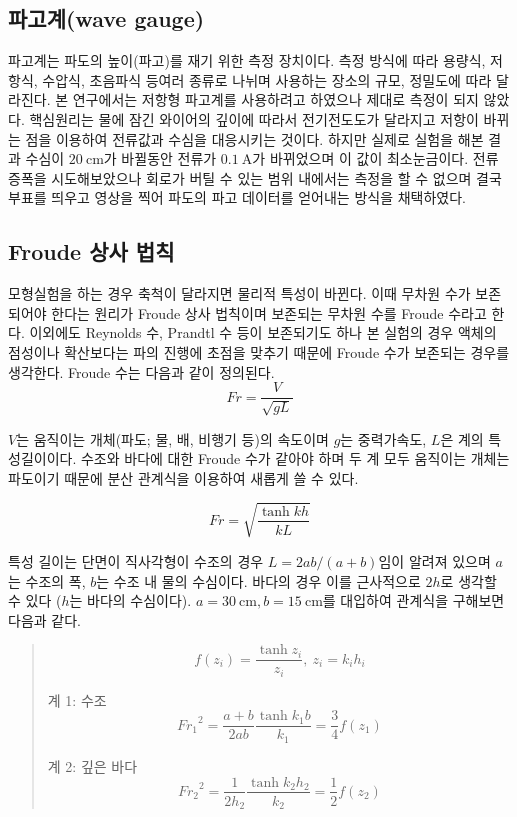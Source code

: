 \subsection{파고계(wave gauge)}

파고계는 파도의 높이(파고)를 재기 위한 측정 장치이다. 측정 방식에 따라 용량식, 저항식, 수압식, 초음파식 등여러 종류로 나뉘며 사용하는 장소의 규모, 정밀도에 따라 달라진다. 본 연구에서는 저항형 파고계를 사용하려고 하였으나 제대로 측정이 되지 않았다. 핵심원리는 물에 잠긴 와이어의 깊이에 따라서 전기전도도가 달라지고 저항이 바뀌는 점을 이용하여 전류값과 수심을 대응시키는 것이다. 하지만 실제로 실험을 해본 결과 수심이 $20\mathrm{~cm}$가 바뀔동안 전류가 $0.1\mathrm{~A}$가 바뀌었으며 이 값이 최소눈금이다. 전류 증폭을 시도해보았으나 회로가 버틸 수 있는 범위 내에서는 측정을 할 수 없으며 결국 부표를 띄우고 영상을 찍어 파도의 파고 데이터를 얻어내는 방식을 채택하였다.

\subsection{Froude 상사 법칙}
모형실험을 하는 경우 축척이 달라지면 물리적 특성이 바뀐다. 이때 무차원 수가 보존되어야 한다는 원리가 Froude 상사 법칙이며 보존되는 무차원 수를 Froude 수라고 한다.\cite{briggs2013basics, chakrabarti1994offshore} 이외에도 Reynolds 수, Prandtl 수 등이 보존되기도 하나 본 실험의 경우 액체의 점성이나 확산보다는 파의 진행에 초점을 맞추기 때문에 Froude 수가 보존되는 경우를 생각한다. Froude 수는 다음과 같이 정의된다.
\begin{equation}
    Fr = \frac{V}{\sqrt{gL}}
\end{equation}

$V$는 움직이는 개체(파도; 물, 배, 비행기 등)의 속도이며 $g$는 중력가속도, $L$은 계의 특성길이이다. 수조와 바다에 대한 Froude 수가 같아야 하며 두 계 모두 움직이는 개체는 파도이기 때문에 분산 관계식을 이용하여 새롭게 쓸 수 있다.

\begin{equation}
    Fr = \sqrt{\frac{\tanh{kh}}{kL}}
\end{equation}

특성 길이는 단면이 직사각형이 수조의 경우 $L = {2ab}/{(a+b)}$임이 알려져 있으며 $a$는 수조의 폭, $b$는 수조 내 물의 수심이다. 바다의 경우 이를 근사적으로 $2h$로 생각할 수 있다 ($h$는 바다의 수심이다). $a=30\mathrm{~cm}, b=15\mathrm{~cm}$를 대입하여 관계식을 구해보면 다음과 같다.

\begin{quote}
    \[f(z_i) = \frac{\tanh{z_i}}{z_i},~  z_i = k_i h_i\]

    \begin{multicols}{2}

    계 1: 수조
    \[{Fr_1}^{2} = \frac{a+b}{2ab} \frac{\tanh{k_1 b}}{k_1} = \frac{3}{4} f(z_{1})\]

    \columnbreak
    
    계 2: 깊은 바다
    \[{Fr_2}^{2} = \frac{1}{2h_2} \frac{\tanh{k_2 h_2}}{k_2} = \frac{1}{2} f(z_{2})\]
    \end{multicols}

\end{quote}

